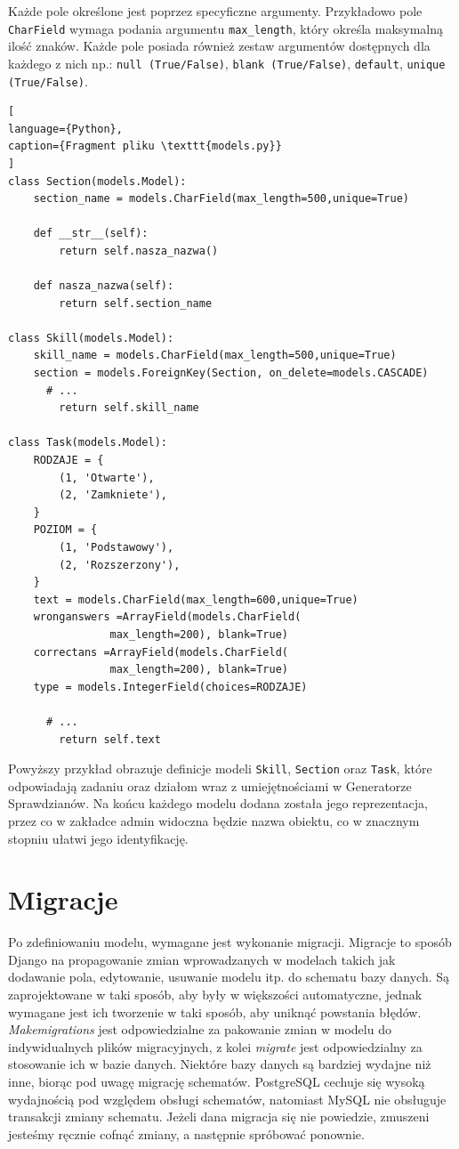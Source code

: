 \documentclass[oneside,polski,logo,indent]{amuthesis}
\begin{document}
Każde pole określone jest poprzez specyficzne argumenty. Przykładowo pole \texttt{CharField} wymaga podania argumentu \texttt{max\_length}, który określa maksymalną ilość znaków. Każde pole posiada również zestaw argumentów dostępnych dla każdego z nich np.: \texttt{null (True/False)}, \texttt{blank (True/False)}, \texttt{default}, \texttt{unique (True/False)}.

\begin{lstlisting}[
language={Python},
caption={Fragment pliku \texttt{models.py}}
]
class Section(models.Model):
    section_name = models.CharField(max_length=500,unique=True)

    def __str__(self):
        return self.nasza_nazwa()

    def nasza_nazwa(self):
        return self.section_name

class Skill(models.Model):
    skill_name = models.CharField(max_length=500,unique=True)
    section = models.ForeignKey(Section, on_delete=models.CASCADE)
	  # ...
        return self.skill_name

class Task(models.Model):
    RODZAJE = {
        (1, 'Otwarte'),
        (2, 'Zamkniete'),
    }
    POZIOM = {
        (1, 'Podstawowy'),
        (2, 'Rozszerzony'),
    }
    text = models.CharField(max_length=600,unique=True)
    wronganswers =ArrayField(models.CharField(
				max_length=200), blank=True)
    correctans =ArrayField(models.CharField(
				max_length=200), blank=True)
    type = models.IntegerField(choices=RODZAJE)

	  # ...
        return self.text
\end{lstlisting}

Powyższy przykład obrazuje definicje modeli \texttt{Skill}, \texttt{Section} oraz \texttt{Task}, które odpowiadają zadaniu oraz działom wraz z umiejętnościami w Generatorze Sprawdzianów. Na końcu każdego modelu dodana została jego reprezentacja, przez co w zakładce admin widoczna będzie nazwa obiektu, co w znacznym stopniu ułatwi jego identyfikację.  
\section{Migracje}
Po zdefiniowaniu modelu, wymagane jest wykonanie migracji. Migracje to sposób Django na propagowanie zmian wprowadzanych w modelach takich jak dodawanie pola, edytowanie, usuwanie modelu itp. do schematu bazy danych. Są zaprojektowane w taki sposób, aby były w większości automatyczne, jednak wymagane jest ich tworzenie w taki sposób, aby uniknąć powstania błędów. \emph{Makemigrations} jest odpowiedzialne za pakowanie zmian w modelu do indywidualnych plików migracyjnych, z kolei \emph{migrate} jest odpowiedzialny za stosowanie ich w bazie danych.
Niektóre bazy danych są bardziej wydajne niż inne, biorąc pod uwagę migrację schematów. PostgreSQL cechuje się wysoką wydajnością pod względem obsługi schematów, natomiast MySQL nie obsługuje transakcji zmiany schematu. Jeżeli dana migracja się nie powiedzie, zmuszeni jesteśmy ręcznie cofnąć zmiany, a następnie spróbować ponownie. 
\end{document}
